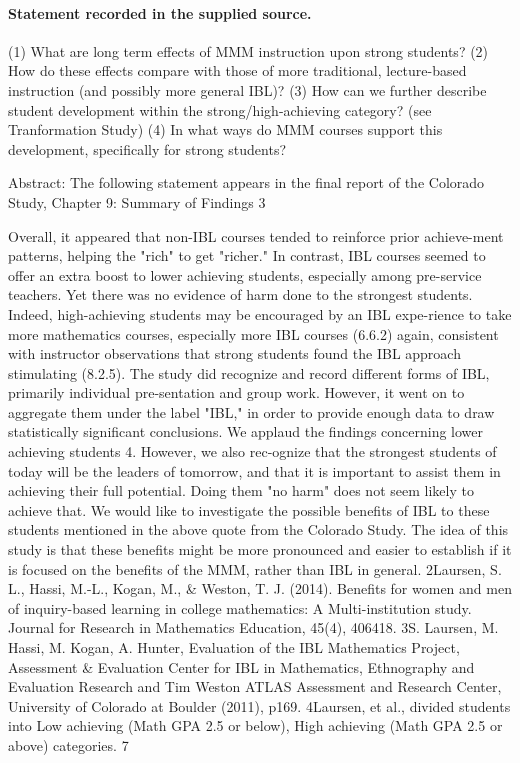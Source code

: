 \documentclass[11pt]{article}
\begin{document}
\paragraph{Statement recorded in the supplied source.}
(1) What are long term effects of MMM instruction upon strong students? (2) How do these effects compare with those of more traditional, lecture-based instruction (and possibly more general IBL)? (3) How can we further describe student development within the strong/high-achieving category? (see Tranformation Study) (4) In what ways do MMM courses support this development, specifically for strong students?

Abstract: The following statement appears in the final report of the Colorado Study, Chapter 9: Summary of Findings 3

Overall, it appeared that non-IBL courses tended to reinforce prior achieve-ment patterns, helping the "rich" to get "richer." In contrast, IBL courses seemed to offer an extra boost to lower achieving students, especially among pre-service teachers. Yet there was no evidence of harm done to the strongest students. Indeed, high-achieving students may be encouraged by an IBL expe-rience to take more mathematics courses, especially more IBL courses (6.6.2) again, consistent with instructor observations that strong students found the IBL approach stimulating (8.2.5). The study did recognize and record different forms of IBL, primarily individual pre-sentation and group work. However, it went on to aggregate them under the label "IBL," in order to provide enough data to draw statistically significant conclusions. We applaud the findings concerning lower achieving students 4. However, we also rec-ognize that the strongest students of today will be the leaders of tomorrow, and that it is important to assist them in achieving their full potential. Doing them "no harm" does not seem likely to achieve that. We would like to investigate the possible benefits of IBL to these students mentioned in the above quote from the Colorado Study. The idea of this study is that these benefits might be more pronounced and easier to establish if it is focused on the benefits of the MMM, rather than IBL in general.
2Laursen, S. L., Hassi, M.-L., Kogan, M., \& Weston, T. J. (2014). Benefits for women and men of inquiry-based learning in college mathematics: A Multi-institution study. Journal for Research in Mathematics Education, 45(4), 406418.
3S. Laursen, M. Hassi, M. Kogan, A. Hunter, Evaluation of the IBL Mathematics Project, Assessment \& Evaluation Center for IBL in Mathematics, Ethnography and Evaluation Research and Tim Weston ATLAS Assessment and Research Center, University of Colorado at Boulder (2011), p169.
4Laursen, et al., divided students into Low achieving (Math GPA 2.5 or below), High achieving (Math GPA 2.5 or above) categories. 7
\end{document}
